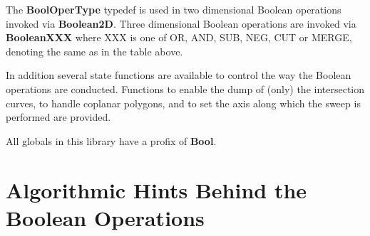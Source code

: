 The {\bf BoolOperType} typedef is used in two dimensional Boolean operations
invoked via {\bf Boolean2D}. Three dimensional Boolean operations are
invoked via {\bf BooleanXXX} where XXX is one of OR, AND, SUB, NEG, CUT
or MERGE, denoting the same as in the table above.

In addition several state functions are available to control the way
the Boolean operations are conducted. Functions to enable the dump of
(only) the intersection curves, to handle coplanar polygons, and to
set the axis along which the sweep is performed are provided.

All globals in this library have a profix of {\bf Bool}.


\section{Algorithmic Hints Behind the Boolean Operations}

